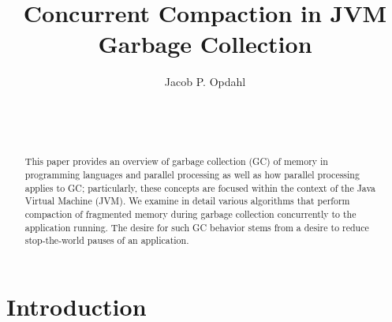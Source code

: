 \documentclass{sig-alternate}
\begin{document}

\title{Concurrent Compaction in JVM Garbage Collection}


\author{
\alignauthor
Jacob P. Opdahl\\
	\\
	\\
	\\
}

\maketitle
\begin{abstract}
This paper provides an overview of garbage collection (GC) of memory 
in programming languages and parallel processing as well as how 
parallel processing applies to GC; particularly, these
concepts are focused within the context of the Java Virtual Machine (JVM).
We examine in detail various algorithms that perform compaction of fragmented 
memory during garbage collection concurrently to the application running.
The desire for such GC behavior stems from a desire to reduce stop-the-world
pauses of an application.
\end{abstract}



\section{Introduction}
\label{sec:introduction}
\end{document}
